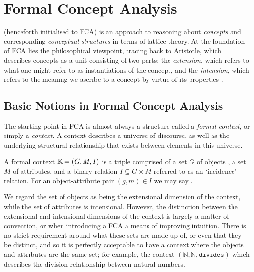 \chapter{Formal Concept Analysis}
\label{chapter:formal-concept-analysis}

\FCA (henceforth initialised to FCA) is an approach to reasoning about \textit{concepts}
and corresponding \textit{conceptual structures} in terms of lattice theory. At the
foundation of FCA lies the philosophical viewpoint, tracing back to Aristotle, which
describes concepts as a unit consisting of two parts: the \textit{extension},
which refers to what one might refer to as instantiations of the concept, and the
\textit{intension}, which refers to the meaning we ascribe to a concept by virtue
of its properties \cite{ganter1999formal, WILLE1992493, DUQUENNE1999407}.

\section{Basic Notions in Formal Concept Analysis}
\label{section:basic-notions}

The starting point in FCA is almost always a structure called a \textit{formal
context}, or simply a \textit{context}. A context describes a universe of
discourse, as well as the underlying structural relationship that exists between
elements in this universe.
%
\begin{definition}
   \label{definition:formal-context} A formal context $\mathbb{K}
  = (G,M,\mathrel{I})$ is a triple comprised of a set $G$ of objects , a set $M$ of attributes,
  and a binary relation $I \subseteq G \times M$ referred to as an `incidence'
  relation. For an object-attribute pair $(g,m) \in I$ we may say .
\end{definition}

We regard the set of objects as being the extensional dimension of the context,
while the set of attributes is intensional. However, the distinction between the    
extensional and intensional dimensions of the context is largely a matter of
convention, or when introducing a FCA a means of improving intuition. There is
no strict requirement around what these sets are made up of, or even that they be
distinct, and so it is perfectly acceptable to have a context where the objects
and attributes are the same set; for example, the context
$(\mathbb{N}, \mathbb{N}, \texttt{divides})$ which describes the division
relationship between natural numbers.

